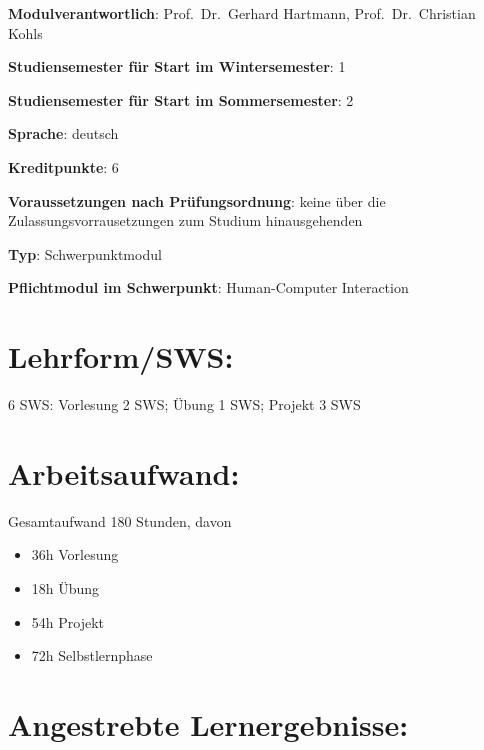 \begin{modulHead}
\textbf{Modulverantwortlich}: Prof.~Dr.~Gerhard
Hartmann, Prof.~Dr.~Christian
Kohls
\end{modulHead}
\begin{modulHead}
\textbf{Studiensemester für
Start im Wintersemester}:
1
\end{modulHead}
\begin{modulHead}
\textbf{Studiensemester für Start
im Sommersemester}:
2
\end{modulHead}
\begin{modulHead}
\textbf{Sprache}:
deutsch
\end{modulHead}
\begin{modulHead}
\textbf{Kreditpunkte}:
6
\end{modulHead}
\begin{modulHead}
\textbf{Voraussetzungen nach
Prüfungsordnung}: keine über die Zulassungsvorrausetzungen zum Studium
hinausgehenden
\end{modulHead}
\begin{modulHead}
\textbf{Typ}:
Schwerpunktmodul
\end{modulHead}
\begin{modulHead}
\textbf{Pflichtmodul
im Schwerpunkt}: Human-Computer Interaction
\end{modulHead}


\section*{Lehrform/SWS:}\label{lehrformsws-4}

6 SWS: Vorlesung 2 SWS; Übung 1 SWS; Projekt 3 SWS

\section*{Arbeitsaufwand:}\label{arbeitsaufwand-5}

Gesamtaufwand 180 Stunden, davon

\begin{itemize}
\tightlist
\item
  36h Vorlesung
\item
  18h Übung
\item
  54h Projekt
\item
  72h Selbstlernphase
\end{itemize}

\section*{Angestrebte
Lernergebnisse:}\label{angestrebte-lernergebnisse-4}

